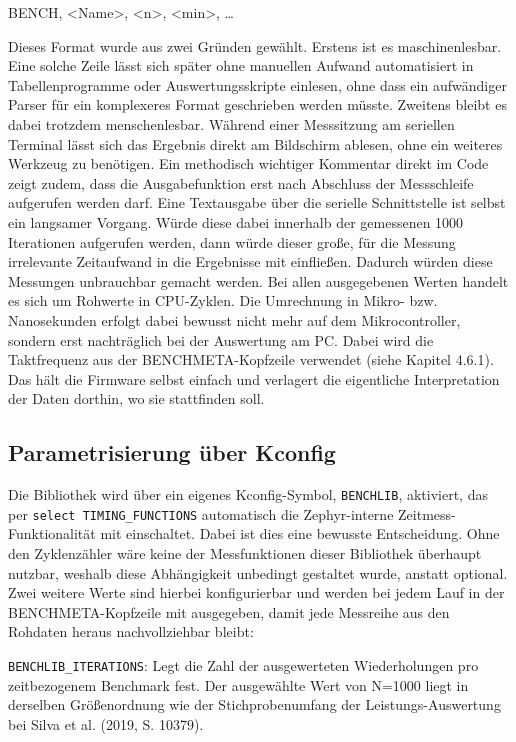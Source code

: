 BENCH, <Name>, <n>, <min>, \ldots{}

Dieses Format wurde aus zwei Gr{\"u}nden gew{\"a}hlt. Erstens ist es maschinenlesbar. Eine solche Zeile l{\"a}sst sich sp{\"a}ter ohne manuellen Aufwand automatisiert in Tabellenprogramme oder Auswertungsskripte einlesen, ohne dass ein aufw{\"a}ndiger Parser f{\"u}r ein komplexeres Format geschrieben werden m{\"u}sste. Zweitens bleibt es dabei trotzdem menschenlesbar. W{\"a}hrend einer Messsitzung am seriellen Terminal l{\"a}sst sich das Ergebnis direkt am Bildschirm ablesen, ohne ein weiteres Werkzeug zu ben{\"o}tigen. Ein methodisch wichtiger Kommentar direkt im Code zeigt zudem, dass die Ausgabefunktion erst nach Abschluss der Messschleife aufgerufen werden darf. Eine Textausgabe {\"u}ber die serielle Schnittstelle ist selbst ein langsamer Vorgang. W{\"u}rde diese dabei innerhalb der gemessenen 1000 Iterationen aufgerufen werden, dann w{\"u}rde dieser gro{\ss}e, f{\"u}r die Messung irrelevante Zeitaufwand in die Ergebnisse mit einflie{\ss}en. Dadurch w{\"u}rden diese Messungen unbrauchbar gemacht werden. Bei allen ausgegebenen Werten handelt es sich um Rohwerte in CPU-Zyklen. Die Umrechnung in Mikro- bzw. Nanosekunden erfolgt dabei bewusst nicht mehr auf dem Mikrocontroller, sondern erst nachtr{\"a}glich bei der Auswertung am PC. Dabei wird die Taktfrequenz aus der BENCHMETA-Kopfzeile verwendet (siehe Kapitel 4.6.1). Das h{\"a}lt die Firmware selbst einfach und verlagert die eigentliche Interpretation der Daten dorthin, wo sie stattfinden soll.

\subsection{Parametrisierung {\"u}ber Kconfig}
Die Bibliothek wird {\"u}ber ein eigenes Kconfig-Symbol, \lstinline[style=codeinline]|BENCHLIB|, aktiviert, das per \lstinline[style=codeinline]|select TIMING_FUNCTIONS| automatisch die Zephyr-interne Zeitmess-Funktionalit{\"a}t mit einschaltet. Dabei ist dies eine bewusste Entscheidung. Ohne den Zyklenz{\"a}hler w{\"a}re keine der Messfunktionen dieser Bibliothek {\"u}berhaupt nutzbar, weshalb diese Abh{\"a}ngigkeit unbedingt gestaltet wurde, anstatt optional. Zwei weitere Werte sind hierbei konfigurierbar und werden bei jedem Lauf in der BENCHMETA-Kopfzeile mit ausgegeben, damit jede Messreihe aus den Rohdaten heraus nachvollziehbar bleibt:

\lstinline[style=codeinline]|BENCHLIB_ITERATIONS|: Legt die Zahl der ausgewerteten Wiederholungen pro zeitbezogenem Benchmark fest. Der ausgew{\"a}hlte Wert von N=1000 liegt in derselben Gr{\"o}{\ss}enordnung wie der Stichprobenumfang der Leistungs-Auswertung bei Silva et al. (2019, S. 10379).


